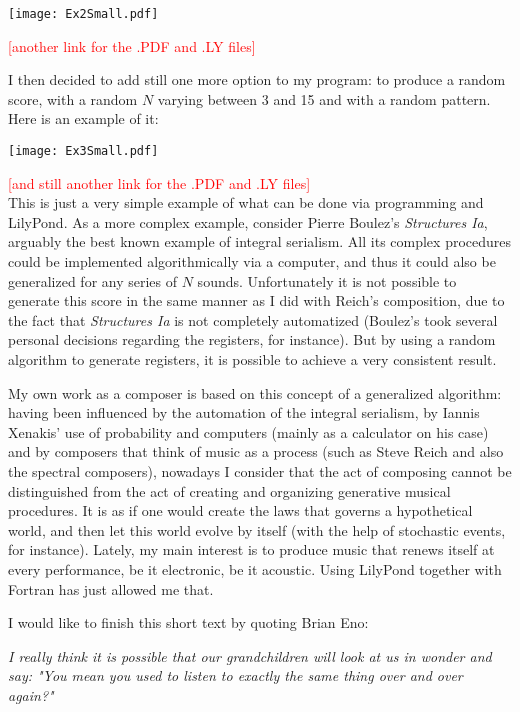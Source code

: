 \documentclass{article}
\begin{document}
\texttt{[image: Ex2Small.pdf]}

\textcolor{red}{[another link for the .PDF and .LY files]}

I then decided to add still one more option to my program: to produce a random score, with a random $N$ varying
between 3 and 15 and with a random pattern. 
Here is an example of it:

\texttt{[image: Ex3Small.pdf]}

\textcolor{red}{[and still another link for the .PDF and .LY files]} \\

This is just a very simple example of what can be done via programming and LilyPond. 
As a more complex example, consider Pierre Boulez's \textit{Structures Ia}, arguably the best known example of 
integral serialism. All its complex procedures could be implemented algorithmically via a computer, and thus it 
could also be generalized for any series of $N$ sounds. Unfortunately it is not possible to generate this score 
in the same manner as I did with Reich's composition, due to the fact that \textit{Structures Ia} is not completely 
automatized (Boulez's took several personal decisions regarding the registers, for instance). But by using a random 
algorithm to generate registers, it is possible to achieve a very consistent result.

My own work as a composer is based on this concept of a generalized algorithm: 
having been influenced by the automation of the integral serialism, by Iannis Xenakis' use of probability and
computers (mainly as a calculator on his case) and by composers that think of music as a process (such as Steve
Reich and also the spectral composers), nowadays I consider that the act of composing cannot be distinguished from
the act of creating and organizing generative musical procedures. 
It is as if one would create the laws that governs a hypothetical world, and then let this world evolve by
itself (with the help of stochastic events, for instance). 
Lately, my main interest is to produce music that renews itself at every performance, be it electronic,
be it acoustic. 
Using LilyPond together with Fortran has just allowed me that.

I would like to finish this short text by quoting Brian Eno:

\textit{I really think it is possible that our grandchildren will look at us in wonder and say:
"You mean you used to listen to exactly the same thing over and over again?"}
\end{document}
